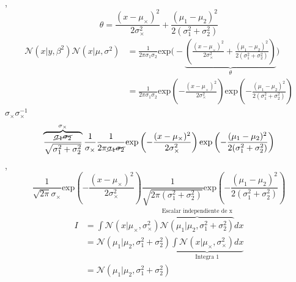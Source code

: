 \documentclass[a4paper,11pt]{book}
\newcommand{\N}{\mathcal{N}}
\theoremstyle{definition}
\newif\ifen
\newif\ifes
\newcommand{\en}[1]{\ifen#1\fi}
\newcommand{\es}[1]{\ifes#1\fi}
\begin{document}
%
\en{Then},
\begin{equation}
 \theta = \frac{(x-\mu_{\times})^2}{2\sigma_{\times}^2} + \frac{(\mu_1 - \mu_2)^2}{2(\sigma_1^2 + \sigma_2^2)}
\end{equation}
%
\en{Putting $\theta$ in place}
\begin{equation}
\begin{split}
 \N(x|y,\beta^2)\N(x|\mu,\sigma^2) & = \frac{1}{2\pi\sigma_1\sigma_2}\text{exp}\Bigg(-\underbrace{\left( \frac{(x-\mu_{\times})^2}{2\sigma_{\times}^2} + \frac{(\mu_1 - \mu_2)^2}{2(\sigma_1^2 + \sigma_2^2)} \right)}_{\theta} \Bigg) \\
 & = \frac{1}{2\pi\sigma_1\sigma_2}\text{exp}\left(  - \frac{(x-\mu_{\times})^2}{2\sigma_{\times}^2} \right) \text{exp} \left( - \frac{(\mu_1 - \mu_2)^2}{2(\sigma_1^2 + \sigma_2^2)} \right)
\end{split}
\end{equation}
%
\en{Multiplying by} $\sigma_{\times}\sigma_{\times}^{-1}$
\begin{equation}
\overbrace{\frac{\cancel{\sigma_1\sigma_2}}{\sqrt{\sigma_1^2+\sigma_2^2}}}^{\sigma_{\times}} \frac{1}{\sigma_{\times}} \frac{1}{2\pi\cancel{\sigma_1\sigma_2}}\text{exp}\left(  - \frac{(x-\mu_{\times})^2}{2\sigma_{\times}^2} \right) \text{exp} \left( - \frac{(\mu_1 - \mu_2)^2}{2(\sigma_1^2 + \sigma_2^2)} \right)
\end{equation}
%
\en{Then},
\begin{equation}
 \frac{1}{\sqrt{2\pi}\sigma_{\times}}\text{exp}\left(  - \frac{(x-\mu_{\times})^2}{2\sigma_{\times}^2} \right) \frac{1}{\sqrt{2\pi(\sigma_1^2+\sigma_2^2)}} \text{exp} \left( - \frac{(\mu_1 - \mu_2)^2}{2(\sigma_1^2 + \sigma_2^2)} \right)
\end{equation}
%
\en{Going back to the integral}
\begin{equation}
\begin{split}
I & = \int \N(x|\mu_{\times},\sigma_{\times}^2) \overbrace{\N(\mu_1|\mu_2,\sigma_1^2 + \sigma_2^2)}^{\text{Escalar independiente de x}} dx \\[0.3cm]
& = \N(\mu_1|\mu_2,\sigma_1^2 + \sigma_2^2) \underbrace{\int \N(x|\mu_{\times},\sigma_{\times}^2)  dx}_{\text{Integra 1}} \\
& = \N(\mu_1|\mu_2,\sigma_1^2 + \sigma_2^2)
\end{split}
\end{equation}

\subsection{\en{Sum of Gaussians}}\label{suma_normales_induccion}
\end{document}
